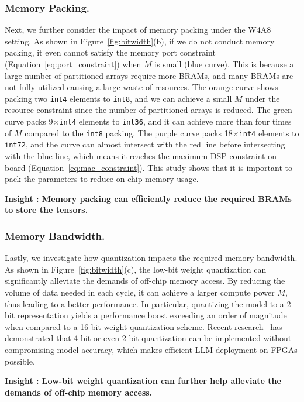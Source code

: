 \subsubsection{Memory Packing.}
Next, we further consider the impact of memory packing under the W4A8 setting.
As shown in Figure~\ref{fig:bitwidth}(b), if we do not conduct memory packing, it even cannot satisfy the memory port constraint (Equation~\eqref{eq:port_constraint}) when $M$ is small (blue curve).
This is because a large number of partitioned arrays require more BRAMs, and many BRAMs are not fully utilized causing a large waste of resources.
The orange curve shows packing two \texttt{int4} elements to \texttt{int8}, and we can achieve a small $M$ under the resource constraint since the number of partitioned arrays is reduced.
The green curve packs 9$\times$\texttt{int4} elements to \texttt{int36}, and it can achieve more than four times of $M$ compared to the \texttt{int8} packing.
The purple curve packs 18$\times$\texttt{int4} elements to \texttt{int72}, and the curve can almost intersect with the red line before intersecting with the blue line, which means it reaches the maximum DSP constraint on-board (Equation~\eqref{eq:mac_constraint}).
This study shows that it is important to pack the parameters to reduce on-chip memory usage.

\textbf{Insight \RNum{\theinsight}: Memory packing can efficiently reduce the required BRAMs to store the tensors.}

\subsubsection{Memory Bandwidth.}
Lastly, we investigate how quantization impacts the required memory bandwidth.
As shown in Figure~\ref{fig:bitwidth}(c), the low-bit weight quantization can significantly alleviate the demands of off-chip memory access.
By reducing the volume of data needed in each cycle, it can achieve a larger compute power $M$, thus leading to a better performance.
In particular, quantizing the model to a 2-bit representation yields a performance boost exceeding an order of magnitude when compared to a 16-bit weight quantization scheme.
Recent research~\cite{zhao2023atom,chee2023quip} has demonstrated that 4-bit or even 2-bit quantization can be implemented without compromising model accuracy, which makes efficient LLM deployment on FPGAs possible.

\textbf{Insight \RNum{\theinsight}: Low-bit weight quantization can further help alleviate the demands of off-chip memory access.}

